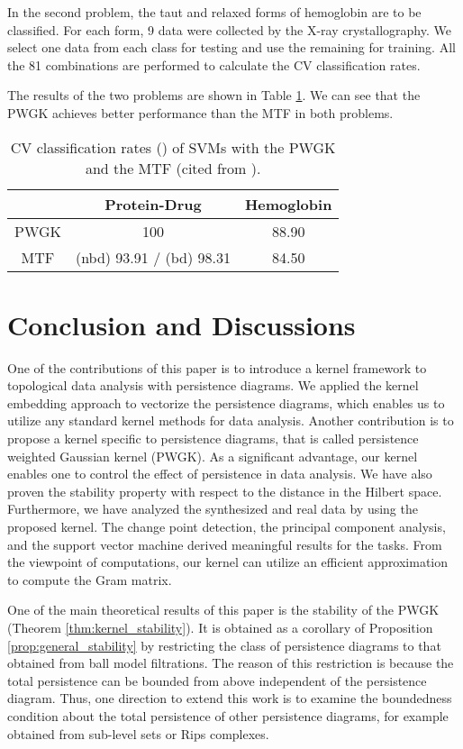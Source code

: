 \documentclass{article}
\begin{document}
In the second problem, the taut and relaxed forms of hemoglobin are to be classified.
For each form, 9 data were collected by the X-ray crystallography.
We select one data from each class for testing and use the remaining  for training.
All the 81 combinations are performed to calculate the CV classification rates.

The results of the two problems are shown in Table \ref{table:Protein_results}.
We can see that the PWGK achieves better performance than the MTF in both problems.
\begin{table}[ttt]
\caption{CV classification rates () of SVMs with the PWGK and the MTF (cited from \cite{CMWOXW15}).}
\label{table:Protein_results}
\centering
\begin{tabular}{c|c c}
\hline
& Protein-Drug  &  Hemoglobin \\ \hline
PWGK  &  100  & 88.90  \\
MTF  &  (nbd) 93.91 / (bd) 98.31 & 84.50 \\
\hline
\end{tabular}
\vspace{-3mm}
\end{table}


\section{Conclusion and Discussions}

One of the contributions of this paper is to introduce a kernel framework to topological data analysis with persistence diagrams.
We applied the kernel embedding approach to vectorize the persistence diagrams, which enables us to utilize any standard kernel methods for data analysis.
Another contribution is to propose a kernel specific to persistence diagrams, that is called persistence weighted Gaussian kernel (PWGK).
As a significant advantage, our kernel enables one to control the effect of persistence in data analysis.
We have also proven the stability property with respect to the distance in the Hilbert space.
Furthermore, we have analyzed the synthesized and real data by using the proposed kernel.
The change point detection, the principal component analysis, and the support vector machine derived meaningful results for the tasks. From the viewpoint of computations, our kernel can utilize an efficient approximation to compute the Gram matrix.

One of the main theoretical results of this paper is the stability of the PWGK (Theorem \ref{thm:kernel_stability}).
It is obtained as a corollary of Proposition \ref{prop:general_stability} by restricting the class of persistence diagrams to that obtained from ball model filtrations.
The reason of this restriction is because the total persistence can be bounded from above independent of the persistence diagram.
Thus, one direction to extend this work is to examine the boundedness condition about the total persistence of other persistence diagrams, for example obtained from sub-level sets or Rips complexes.
\end{document}
